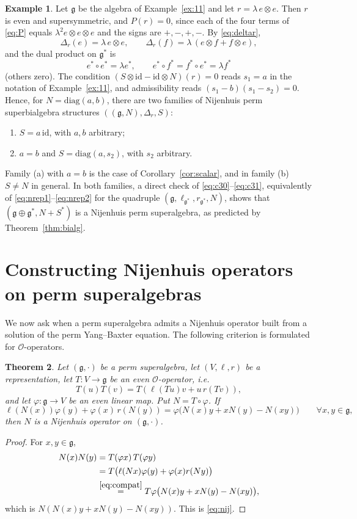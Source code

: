 \documentclass[11pt]{article}
\newtheorem{theorem}{Theorem}[section]
\theoremstyle{definition}
\newtheorem{example}[theorem]{Example}
\newcommand{\g}{\mathfrak{g}}
\newcommand{\id}{\mathrm{id}}
\begin{document}
\begin{example}\label{ex:Nbialg11}
Let $\g$ be the algebra of Example~\ref{ex:11} and let $r=\lambda\,e\otimes e$. Then $r$ is even and supersymmetric, and $P(r)=0$, since each of the four terms of \eqref{eq:P} equals $\lambda^2e\otimes e\otimes e$ and the signs are $+,-,+,-$. By \eqref{eq:deltar},
\[
\Delta_r(e)=\lambda\,e\otimes e,
\qquad
\Delta_r(f)=\lambda\,(e\otimes f+f\otimes e),
\]
and the dual product on $\g^*$ is
\[
e^*\circ e^*=\lambda e^*,
\qquad
e^*\circ f^*=f^*\circ e^*=\lambda f^*
\]
(others zero). The condition $(S\otimes\id-\id\otimes N)(r)=0$ reads $s_1=a$ in the notation of Example~\ref{ex:11}, and admissibility reads $(s_1-b)(s_1-s_2)=0$. Hence, for $N=\mathrm{diag}(a,b)$, there are two families of Nijenhuis perm superbialgebra structures $((\g,N),\Delta_r,S)$:
\begin{enumerate}[label=(\alph*),itemsep=0pt]
\item $S=a\,\id$, with $a,b$ arbitrary;
\item $a=b$ and $S=\mathrm{diag}(a,s_2)$, with $s_2$ arbitrary.
\end{enumerate}
Family (a) with $a=b$ is the case of Corollary~\ref{cor:scalar}, and in family (b) $S\neq N$ in general. In both families, a direct check of \eqref{eq:c30}--\eqref{eq:c31}, equivalently of \eqref{eq:nrep1}--\eqref{eq:nrep2} for the quadruple $(\g,\ell_{\g^*},r_{\g^*},N)$, shows that $(\g\oplus\g^*,N+S^*)$ is a Nijenhuis perm superalgebra, as predicted by Theorem~\ref{thm:bialg}.
\end{example}

\section{Constructing Nijenhuis operators on perm superalgebras}\label{sec:construct}

We now ask when a perm superalgebra admits a Nijenhuis operator built from a solution of the perm Yang--Baxter equation. The following criterion is formulated for $\mathcal O$-operators.

\begin{theorem}\label{thm:construct}
Let $(\g,\cdot)$ be a perm superalgebra, let $(V,\ell,r)$ be a representation, let $T:V\to\g$ be an even $\mathcal O$-operator, i.e.
\[
T(u)T(v)=T(\ell(Tu)v+u\,r(Tv)),
\]
and let $\varphi:\g\to V$ be an even linear map. Put $N=T\circ\varphi$. If
\begin{equation}\label{eq:compat}
\ell(N(x))\varphi(y)+\varphi(x)\,r(N(y))
=\varphi\bigl(N(x)y+xN(y)-N(xy)\bigr)
\qquad\forall x,y\in\g,
\end{equation}
then $N$ is a Nijenhuis operator on $(\g,\cdot)$.
\end{theorem}
\begin{proof}
For $x,y\in\g$,
\[
\begin{aligned}
N(x)N(y)
&=T(\varphi x)\,T(\varphi y)\\
&=T\bigl(\ell(N x)\varphi(y)+\varphi(x)r(Ny)\bigr)\\
&\overset{\eqref{eq:compat}}{=}T\varphi\bigl(N(x)y+xN(y)-N(xy)\bigr),
\end{aligned}
\]
which is $N(N(x)y+xN(y)-N(xy))$. This is \eqref{eq:nij}.
\end{proof}
\end{document}
